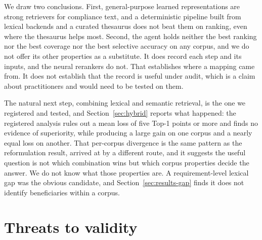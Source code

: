 \documentclass[a4paper,fleqn]{cas-sc}
\begin{document}
We draw two conclusions.
First, general-purpose learned representations are strong retrievers for compliance text, and a deterministic pipeline built from lexical backends and a curated thesaurus does not beat them on ranking, even where the thesaurus helps most.
Second, the agent holds neither the best ranking nor the best coverage nor the best selective accuracy on any corpus, and we do not offer its other properties as a substitute.
It does record each step and its inputs, and the neural rerankers do not. That establishes where a mapping came from. It does not establish that the record is useful under audit, which is a claim about practitioners and would need to be tested on them.

The natural next step, combining lexical and semantic retrieval, is the one we registered and tested, and Section~\ref{sec:hybrid} reports what happened: the registered analysis rules out a mean loss of five Top-1 points or more and finds no evidence of superiority, while producing a large gain on one corpus and a nearly equal loss on another. That per-corpus divergence is the same pattern as the reformulation result, arrived at by a different route, and it suggests the useful question is not which combination wins but which corpus properties decide the answer. We do not know what those properties are. A requirement-level lexical gap was the obvious candidate, and Section~\ref{sec:results-gap} finds it does not identify beneficiaries within a corpus.


\section{Threats to validity}
\label{sec:threats}
\end{document}
